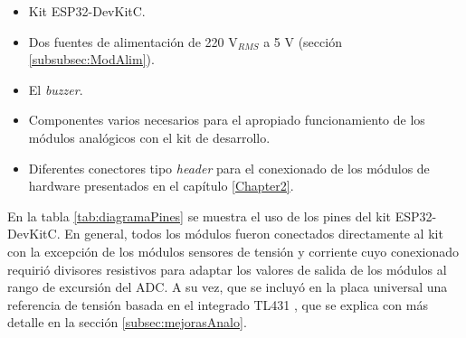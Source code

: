 \begin{itemize}
\item Kit ESP32-DevKitC.
\item Dos fuentes de alimentación de 220 V$_{RMS}$ a 5 V (sección \ref{subsubsec:ModAlim}).
\item El \textit{buzzer}. 
\item Componentes varios necesarios para el apropiado funcionamiento de los módulos analógicos con el kit de desarrollo.
\item Diferentes conectores tipo \textit{header} para el conexionado de los módulos de hardware presentados en el capítulo \ref{Chapter2}.
\end{itemize}

En la tabla \ref{tab:diagramaPines} se muestra el uso de los pines del kit ESP32-DevKitC. En general, todos los módulos fueron conectados directamente al kit con la excepción de los módulos sensores de tensión y corriente cuyo conexionado requirió divisores resistivos para adaptar los valores de salida de los módulos al rango de excursión del ADC. A su vez, que se incluyó en la placa universal una referencia de tensión basada en el integrado TL431 \citep{TL431}, que se explica con más detalle en la sección \ref{subsec:mejorasAnalo}.

